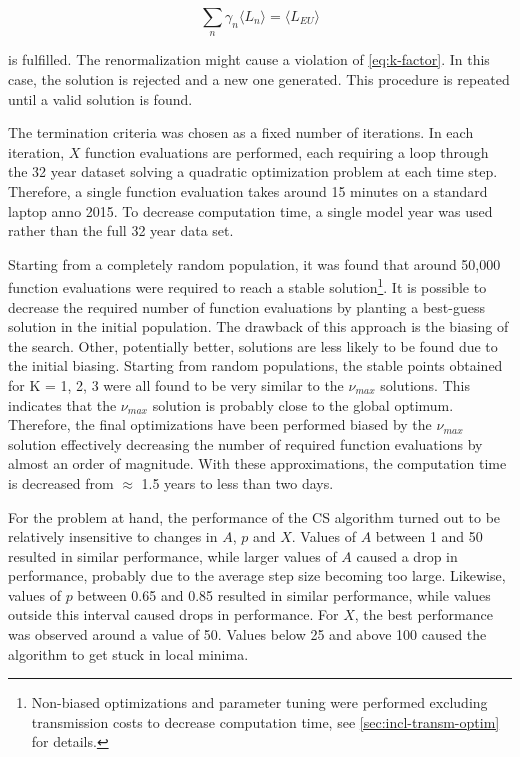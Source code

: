 \documentclass[a4paper, 12pt, sort&compress]{elsarticle}%
\begin{document}
\begin{equation}
  \label{eq:10}
  \sum_{n} \gamma_{n} \langle L_{n} \rangle = \langle L_{EU} \rangle
\end{equation}

is fulfilled. The renormalization might cause a violation of
\cref{eq:k-factor}. In this case, the solution is rejected and a
new one generated. This procedure is repeated until a valid solution
is found.

The termination criteria was chosen as a fixed number of
iterations. In each iteration, $X$ function evaluations are performed,
each requiring a loop through the 32 year dataset solving a quadratic
optimization problem at each time step. Therefore, a single function
evaluation takes around 15 minutes on a standard laptop anno 2015. To
decrease computation time, a single model year was used rather than
the full 32 year data set.

Starting from a completely random population, it was found that around
50,000 function evaluations were required to reach a stable
solution\footnote{Non-biased optimizations and parameter tuning were
  performed excluding transmission costs to decrease computation time,
  see \cref{sec:incl-transm-optim} for details.}.
It is possible to decrease the required number of function evaluations
by planting a best-guess solution in the initial population. The
drawback of this approach is the biasing of the search. Other,
potentially better, solutions are less likely to be found due to the
initial biasing. Starting from random populations, the stable points
obtained for K = 1, 2, 3 were all found to be very similar to the
$\nu_{max}$ solutions. This indicates that the $\nu_{max}$ solution is
probably close to the global optimum. Therefore, the final
optimizations have been performed biased by the $\nu_{max}$ solution
effectively decreasing the number of required function evaluations by
almost an order of magnitude. With these approximations, the
computation time is decreased from $\approx$ 1.5 years to less than
two days.

For the problem at hand, the performance of the CS algorithm turned
out to be relatively insensitive to changes in $A$, $p$ and
$X$. Values of $A$ between 1 and 50 resulted in similar performance,
while larger values of $A$ caused a drop in performance, probably due
to the average step size becoming too large. Likewise, values of $p$
between 0.65 and 0.85 resulted in similar performance, while values
outside this interval caused drops in performance. For $X$, the best
performance was observed around a value of 50. Values below 25 and
above 100 caused the algorithm to get stuck in local minima.
\end{document}
